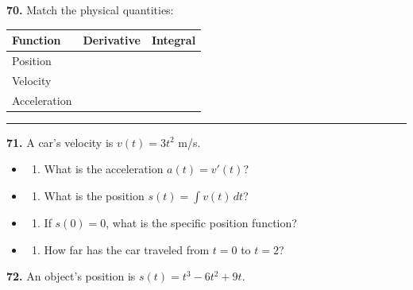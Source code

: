 \documentclass[
  11pt,
]{article}
\providecommand{\tightlist}{%
  \setlength{\itemsep}{0pt}\setlength{\parskip}{0pt}}
\begin{document}
\textbf{70.} Match the physical quantities:

\begin{longtable}[]{@{}lll@{}}
\toprule\noalign{}
Function & Derivative & Integral \\
\midrule\noalign{}
\endhead
\bottomrule\noalign{}
\endlastfoot
Position & & \\
Velocity & & \\
Acceleration & & \\
\end{longtable}

\begin{center}\rule{0.5\linewidth}{0.5pt}\end{center}

\textbf{71.} A car's velocity is \(v(t) = 3t^2\) m/s.

\begin{itemize}
\item
  \begin{enumerate}
  \def\labelenumi{(\alph{enumi})}
  \tightlist
  \item
    What is the acceleration \(a(t) = v'(t)\)?
  \end{enumerate}
\item
  \begin{enumerate}
  \def\labelenumi{(\alph{enumi})}
  \setcounter{enumi}{1}
  \tightlist
  \item
    What is the position \(s(t) = \int v(t) \, dt\)?
  \end{enumerate}
\item
  \begin{enumerate}
  \def\labelenumi{(\alph{enumi})}
  \setcounter{enumi}{2}
  \tightlist
  \item
    If \(s(0) = 0\), what is the specific position function?
  \end{enumerate}
\item
  \begin{enumerate}
  \def\labelenumi{(\alph{enumi})}
  \setcounter{enumi}{3}
  \tightlist
  \item
    How far has the car traveled from \(t = 0\) to \(t = 2\)?
  \end{enumerate}
\end{itemize}

\textbf{72.} An object's position is \(s(t) = t^3 - 6t^2 + 9t\).
\end{document}
